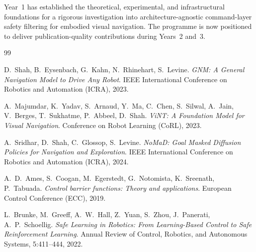 \documentclass[12pt,a4paper]{article}
\begin{document}
Year~1 has established the theoretical, experimental, and infrastructural
foundations for a rigorous investigation into architecture-agnostic
command-layer safety filtering for embodied visual navigation. The programme
is now positioned to deliver publication-quality contributions during Years~2
and~3.

\clearpage
\begin{thebibliography}{99}

D.~Shah, B.~Eysenbach, G.~Kahn, N.~Rhinehart, S.~Levine.
\textit{GNM: A General Navigation Model to Drive Any Robot}.
IEEE International Conference on Robotics and Automation (ICRA), 2023.

A.~Majumdar, K.~Yadav, S.~Arnaud, Y.~Ma, C.~Chen, S.~Silwal,
A.~Jain, V.~Berges, T.~Sukhatme, P.~Abbeel, D.~Shah.
\textit{ViNT: A Foundation Model for Visual Navigation}.
Conference on Robot Learning (CoRL), 2023.

A.~Sridhar, D.~Shah, C.~Glossop, S.~Levine.
\textit{NoMaD: Goal Masked Diffusion Policies for Navigation and Exploration}.
IEEE International Conference on Robotics and Automation (ICRA), 2024.

A.~D.~Ames, S.~Coogan, M.~Egerstedt, G.~Notomista, K.~Sreenath, P.~Tabuada.
\textit{Control barrier functions: Theory and applications}.
European Control Conference (ECC), 2019.

L.~Brunke, M.~Greeff, A.~W.~Hall, Z.~Yuan, S.~Zhou, J.~Panerati,
A.~P.~Schoellig.
\textit{Safe Learning in Robotics: From Learning-Based Control to Safe
Reinforcement Learning}.
Annual Review of Control, Robotics, and Autonomous Systems,
5:411--444, 2022.

\end{thebibliography}
\end{document}
